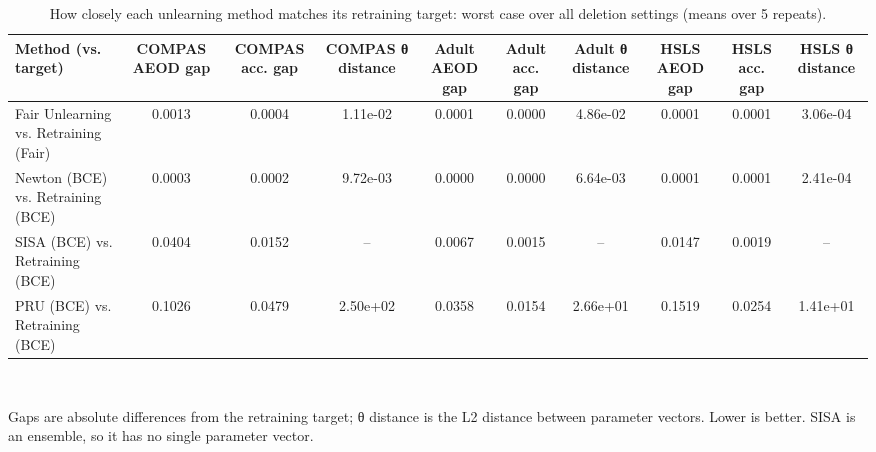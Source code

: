 \begin{table}[t]
\centering
\scriptsize
\caption{How closely each unlearning method matches its retraining target: worst case over all deletion settings (means over 5 repeats).}
\label{tab:approximation}
\begin{tabular}{lccccccccc}
\hline
Method (vs. target) & COMPAS AEOD gap & COMPAS acc. gap & COMPAS θ distance & Adult AEOD gap & Adult acc. gap & Adult θ distance & HSLS AEOD gap & HSLS acc. gap & HSLS θ distance \\
\hline
Fair Unlearning vs. Retraining (Fair) & 0.0013 & 0.0004 & 1.11e-02 & 0.0001 & 0.0000 & 4.86e-02 & 0.0001 & 0.0001 & 3.06e-04 \\
Newton (BCE) vs. Retraining (BCE) & 0.0003 & 0.0002 & 9.72e-03 & 0.0000 & 0.0000 & 6.64e-03 & 0.0001 & 0.0001 & 2.41e-04 \\
SISA (BCE) vs. Retraining (BCE) & 0.0404 & 0.0152 & -- & 0.0067 & 0.0015 & -- & 0.0147 & 0.0019 & -- \\
PRU (BCE) vs. Retraining (BCE) & 0.1026 & 0.0479 & 2.50e+02 & 0.0358 & 0.0154 & 2.66e+01 & 0.1519 & 0.0254 & 1.41e+01 \\
\hline
\end{tabular}
\\[2pt]\parbox{\textwidth}{\footnotesize Gaps are absolute differences from the retraining target; θ distance is the L2 distance between parameter vectors. Lower is better. SISA is an ensemble, so it has no single parameter vector.}
\end{table}
